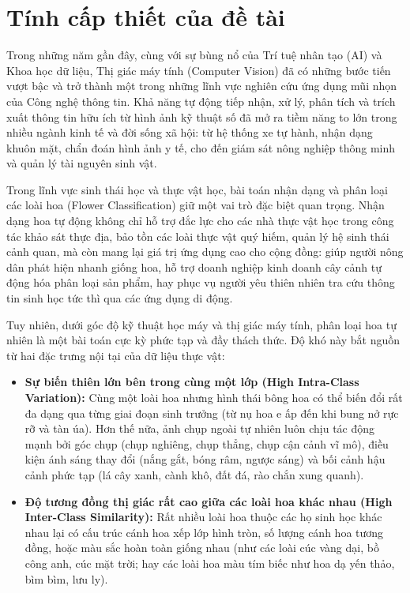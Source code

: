 \documentclass[../DoAn.tex]{subfiles}
\begin{document}
\section{Tính cấp thiết của đề tài}
Trong những năm gần đây, cùng với sự bùng nổ của Trí tuệ nhân tạo (AI) và Khoa học dữ liệu, Thị giác máy tính (Computer Vision) đã có những bước tiến vượt bậc và trở thành một trong những lĩnh vực nghiên cứu ứng dụng mũi nhọn của Công nghệ thông tin. Khả năng tự động tiếp nhận, xử lý, phân tích và trích xuất thông tin hữu ích từ hình ảnh kỹ thuật số đã mở ra tiềm năng to lớn trong nhiều ngành kinh tế và đời sống xã hội: từ hệ thống xe tự hành, nhận dạng khuôn mặt, chẩn đoán hình ảnh y tế, cho đến giám sát nông nghiệp thông minh và quản lý tài nguyên sinh vật.

Trong lĩnh vực sinh thái học và thực vật học, bài toán nhận dạng và phân loại các loài hoa (Flower Classification) giữ một vai trò đặc biệt quan trọng. Nhận dạng hoa tự động không chỉ hỗ trợ đắc lực cho các nhà thực vật học trong công tác khảo sát thực địa, bảo tồn các loài thực vật quý hiếm, quản lý hệ sinh thái cảnh quan, mà còn mang lại giá trị ứng dụng cao cho cộng đồng: giúp người nông dân phát hiện nhanh giống hoa, hỗ trợ doanh nghiệp kinh doanh cây cảnh tự động hóa phân loại sản phẩm, hay phục vụ người yêu thiên nhiên tra cứu thông tin sinh học tức thì qua các ứng dụng di động.

Tuy nhiên, dưới góc độ kỹ thuật học máy và thị giác máy tính, phân loại hoa tự nhiên là một bài toán cực kỳ phức tạp và đầy thách thức. Độ khó này bắt nguồn từ hai đặc trưng nội tại của dữ liệu thực vật:
\begin{itemize}
    \item \textbf{Sự biến thiên lớn bên trong cùng một lớp (High Intra-Class Variation):} Cùng một loài hoa nhưng hình thái bông hoa có thể biến đổi rất đa dạng qua từng giai đoạn sinh trưởng (từ nụ hoa e ấp đến khi bung nở rực rỡ và tàn úa). Hơn thế nữa, ảnh chụp ngoài tự nhiên luôn chịu tác động mạnh bởi góc chụp (chụp nghiêng, chụp thẳng, chụp cận cảnh vĩ mô), điều kiện ánh sáng thay đổi (nắng gắt, bóng râm, ngược sáng) và bối cảnh hậu cảnh phức tạp (lá cây xanh, cành khô, đất đá, rào chắn xung quanh).
    \item \textbf{Độ tương đồng thị giác rất cao giữa các loài hoa khác nhau (High Inter-Class Similarity):} Rất nhiều loài hoa thuộc các họ sinh học khác nhau lại có cấu trúc cánh hoa xếp lớp hình tròn, số lượng cánh hoa tương đồng, hoặc màu sắc hoàn toàn giống nhau (như các loài cúc vàng dại, bồ công anh, cúc mặt trời; hay các loài hoa màu tím biếc như hoa dạ yến thảo, bìm bìm, lưu ly).
\end{itemize}
\end{document}
